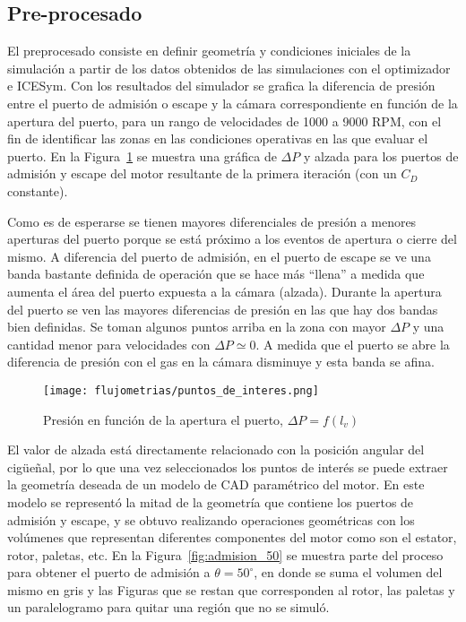 
\subsection{Pre-procesado}
%
El preprocesado consiste en definir geometría y condiciones iniciales de la
simulación a partir de los datos obtenidos de las simulaciones con el
optimizador e ICESym.
%
Con los resultados del simulador se grafica la diferencia de presión entre el
puerto de admisión o escape y la cámara correspondiente en función de la apertura
del puerto, para un rango de velocidades de 1000 a 9000 RPM, con el fin de
identificar las zonas en las condiciones operativas en las que evaluar el puerto.
%
En la Figura~\ref{fig:puntos_interes} se muestra una gráfica de $\Delta P$ y
alzada para los puertos de admisión y escape del motor resultante de la primera
iteración (con un $C_{D}$ constante).

Como es de esperarse se tienen mayores diferenciales de presión a menores
aperturas del puerto porque se está próximo a los eventos de apertura o cierre
del mismo.
%
A diferencia del puerto de admisión, en el puerto de escape se ve una banda
bastante definida de operación que se hace más ``llena'' a medida que aumenta el
área del puerto expuesta a la cámara (alzada).
%
Durante la apertura del puerto se ven las mayores diferencias de presión en las
que hay dos bandas bien definidas.
%
Se toman algunos puntos arriba en la zona con mayor $\Delta P$ y una cantidad
menor para velocidades con $\Delta P \simeq 0$.
%
A medida que el puerto se abre la diferencia de presión con el gas en la cámara
disminuye y esta banda se afina.

\begin{figure}
    \centering
    \texttt{[image: flujometrias/puntos\_de\_interes.png]}
    \caption{Presión en función de la apertura el puerto,
$\Delta P = f(l_{v})$}\label{fig:puntos_interes}
\end{figure}

%
El valor de alzada está directamente relacionado con la posición angular del
cigüeñal, por lo que una vez seleccionados los puntos de interés se puede
extraer la geometría deseada de un modelo de CAD paramétrico del motor.
%
En este modelo se representó la mitad de la geometría que contiene los puertos
de admisión y escape, y se obtuvo realizando operaciones geométricas con los
volúmenes que representan diferentes componentes del motor como son el estator,
rotor, paletas, etc.
%
En la Figura~\ref{fig:admision_50} se muestra parte del proceso para obtener el
puerto de admisión a $\theta=50^{\circ}$, en donde se suma el volumen del mismo
en gris y las Figuras que se restan que corresponden al rotor, las paletas y un
paralelogramo para quitar una región que no se simuló.

